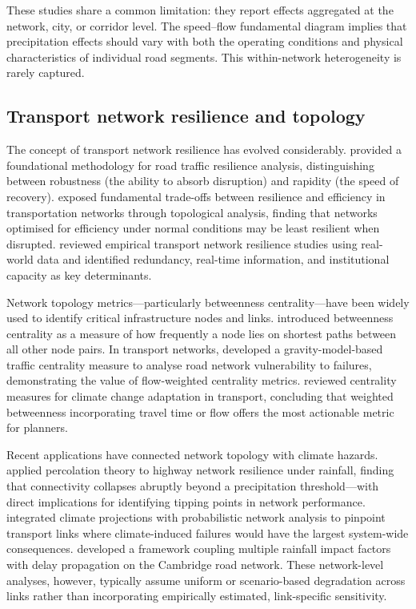 \documentclass[review]{elsarticle}
\begin{document}
These studies share a common limitation: they report effects aggregated at the network, city, or corridor level. The speed--flow fundamental diagram \citep{greenshields1935study} implies that precipitation effects should vary with both the operating conditions and physical characteristics of individual road segments. This within-network heterogeneity is rarely captured.

\subsection{Transport network resilience and topology}
\label{sec:lit:resilience}

The concept of transport network resilience has evolved considerably. \citet{calvert2018methodology} provided a foundational methodology for road traffic resilience analysis, distinguishing between robustness (the ability to absorb disruption) and rapidity (the speed of recovery). \citet{ganin2017resilience} exposed fundamental trade-offs between resilience and efficiency in transportation networks through topological analysis, finding that networks optimised for efficiency under normal conditions may be least resilient when disrupted. \citet{bergantino2024assessing} reviewed empirical transport network resilience studies using real-world data and identified redundancy, real-time information, and institutional capacity as key determinants.

Network topology metrics---particularly betweenness centrality---have been widely used to identify critical infrastructure nodes and links. \citet{freeman1977centrality} introduced betweenness centrality as a measure of how frequently a node lies on shortest paths between all other node pairs. In transport networks, \citet{wassmer2024resilience} developed a gravity-model-based traffic centrality measure to analyse road network vulnerability to failures, demonstrating the value of flow-weighted centrality metrics. \citet{stamos2023centrality} reviewed centrality measures for climate change adaptation in transport, concluding that weighted betweenness incorporating travel time or flow offers the most actionable metric for planners.

Recent applications have connected network topology with climate hazards. \citet{li2024percolation} applied percolation theory to highway network resilience under rainfall, finding that connectivity collapses abruptly beyond a precipitation threshold---with direct implications for identifying tipping points in network performance. \citet{farahmand2024integrating} integrated climate projections with probabilistic network analysis to pinpoint transport links where climate-induced failures would have the largest system-wide consequences. \citet{liu2026extreme} developed a framework coupling multiple rainfall impact factors with delay propagation on the Cambridge road network. These network-level analyses, however, typically assume uniform or scenario-based degradation across links rather than incorporating empirically estimated, link-specific sensitivity.
\end{document}
